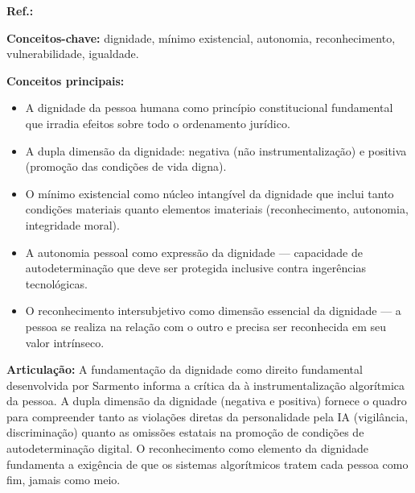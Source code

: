 \begin{fichamento}
    \textbf{Ref.:} \cite{Sarmento2016DPF}
    
    \textbf{Conceitos-chave:} dignidade, mínimo existencial, autonomia, reconhecimento, vulnerabilidade, igualdade.
    
    \textbf{Conceitos principais:}
    \begin{itemize}
        \item A dignidade da pessoa humana como princípio constitucional fundamental que irradia efeitos sobre todo o ordenamento jurídico.
        \item A dupla dimensão da dignidade: negativa (não instrumentalização) e positiva (promoção das condições de vida digna).
        \item O mínimo existencial como núcleo intangível da dignidade que inclui tanto condições materiais quanto elementos imateriais (reconhecimento, autonomia, integridade moral).
        \item A autonomia pessoal como expressão da dignidade — capacidade de autodeterminação que deve ser protegida inclusive contra ingerências tecnológicas.
        \item O reconhecimento intersubjetivo como dimensão essencial da dignidade — a pessoa se realiza na relação com o outro e precisa ser reconhecida em seu valor intrínseco.
    \end{itemize}
    
    \textbf{Articulação:} A fundamentação da dignidade como direito fundamental desenvolvida por Sarmento informa a crítica da \MH{} à instrumentalização algorítmica da pessoa. A dupla dimensão da dignidade (negativa e positiva) fornece o quadro para compreender tanto as violações diretas da personalidade pela IA (vigilância, discriminação) quanto as omissões estatais na promoção de condições de autodeterminação digital. O reconhecimento como elemento da dignidade fundamenta a exigência de que os sistemas algorítmicos tratem cada pessoa como fim, jamais como meio.
\end{fichamento}

